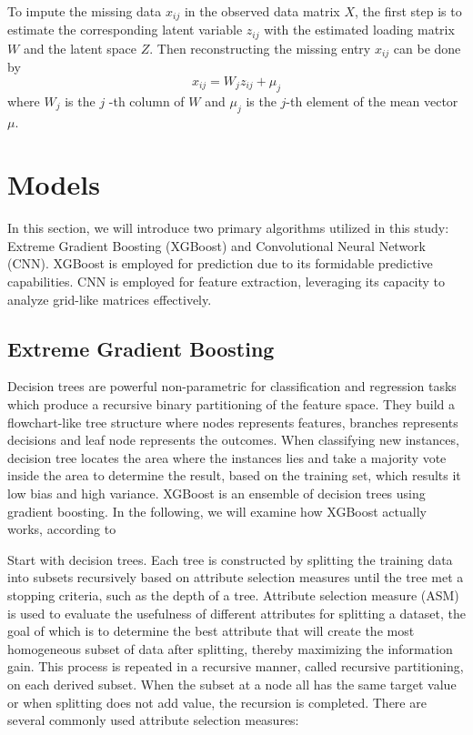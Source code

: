 \documentclass[12pt,a4paper,english
]{tunithesis}
\begin{document}
To impute the missing data $x_{ij}$ in the observed data matrix $X$, the first step is to estimate the corresponding latent variable $z_{ij}$ with the estimated loading matrix $W$ and the latent space $Z$. Then reconstructing the missing entry  $x_{ij}$ can be done by
\begin{equation}
    {x_{ij}} = {W_j}{z_{ij}}+{\mu _j}
\end{equation}
where $W_j$ is the $j$ -th column of $W$ and $\mu_j$ is the $j$-th element of the mean vector $\mu$.


\section{Models}
In this section, we will introduce two primary algorithms utilized in this study: Extreme Gradient Boosting (XGBoost) and Convolutional Neural Network (CNN). XGBoost is employed for prediction due to its formidable predictive capabilities. CNN is employed for feature extraction, leveraging its capacity to analyze grid-like matrices effectively.

\subsection{Extreme Gradient Boosting}
Decision trees are powerful non-parametric for classification and regression tasks which produce a recursive binary partitioning of the feature space. They build a flowchart-like tree structure where nodes represents features, branches represents decisions and leaf node represents the outcomes. When classifying new instances, decision tree locates the area where the instances lies and take a majority vote inside the area to determine the result, based on the training set, which results it low bias and high variance. XGBoost is an ensemble of decision trees using gradient boosting. In the following, we will examine how XGBoost actually works, according to \textcite{song2015, chen2016, mitchell2017, hastie2009, stanford_ml, geek_xgboost}

Start with decision trees. Each tree is constructed by splitting the training data into subsets recursively based on attribute selection measures until the tree met a stopping criteria, such as the depth of a tree. Attribute selection measure (ASM) is used to evaluate the usefulness of different attributes for splitting a dataset, the goal of which is to determine the best attribute that will create the most homogeneous subset of data after splitting, thereby maximizing the information gain. This process is repeated in a recursive manner, called recursive partitioning, on each derived subset. When the subset at a node all has the same target value or when splitting does not add value, the recursion is completed. There are several commonly used attribute selection measures:
\end{document}
